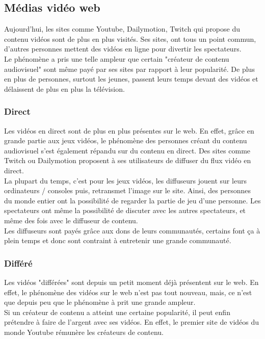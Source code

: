 \documentclass[11pt]{report} %
\begin{document}
		\subsection{Médias vidéo web}
		 Aujourd'hui, les sites comme Youtube, Dailymotion, Twitch qui propose du contenu vidéos sont de plus en plus visités. Ses sites, ont tous un point commun, d'autres personnes mettent des vidéos en ligne pour divertir les spectateurs. \\
		 Le phénomène a pris une telle ampleur que certain "créateur de contenu audiovisuel" sont même payé par ses sites par rapport à leur popularité. De plus en plus de personnes, surtout les jeunes, passent leurs temps devant des vidéos et délaissent de plus en plus la télévision.
			\subsubsection{Direct}
			Les vidéos en direct sont de plus en plus présentes sur le web. En effet, grâce en grande partie aux jeux vidéos, le phénomène des personnes créant du contenu audiovisuel s'est également répandu sur du contenu en direct. Des sites comme Twitch ou Dailymotion proposent à ses utilisateurs de diffuser du flux vidéo en direct. \\ 
			La plupart du temps, c'est pour les jeux vidéos, les diffuseurs jouent sur leurs ordinateurs / consoles puis, retransmet l'image sur le site. Ainsi, des personnes du monde entier ont la possibilité de regarder la partie de jeu d'une personne. Les spectateurs ont même la possibilité de discuter avec les autres spectateurs, et même des fois avec le diffuseur de contenu.\\
			Les diffuseurs sont payés grâce aux dons de leurs communautés, certains font ça à plein temps et donc sont contraint à entretenir une grande communauté.
			\subsubsection{Différé}
			Les vidéos "différées" sont depuis un petit moment déjà présentent sur le web. En effet, le phénomène des vidéos sur le web n'est pas tout nouveau, mais, ce n'est que depuis peu que le phénomène à prit une grande ampleur. \\
			Si un créateur de contenu a atteint une certaine popularité, il peut enfin prétendre à faire de l'argent avec ses vidéos. En effet, le premier site de vidéos du monde Youtube rémunère les créateurs de contenu.
\end{document}
